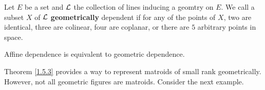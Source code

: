 \begin{definition}
    Let $E$ be a set and $\mathcal{L}$ the collection of lines inducing a geomtry on
    $E$. We call a subset $X$ of $\mathcal{L}$ \textbf{geometrically} dependent if for
    any of the points of $X$, two are identical, three are colinear, four are
    coplanar, or there are  $5$ arbitrary points in space.
\end{definition}

\begin{theorem}\label{1.5.3}
    Affine dependence is equivalent to geometric dependence.
\end{theorem}

Theorem \ref{1.5.3} provides a way to represent matroids of small rank
geometrically. However, not all geometric figures are matroids. Consider the
next example.

